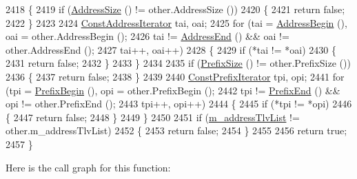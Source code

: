\begin{DoxyCode}
2418 \{
2419   \textcolor{keywordflow}{if} (\hyperlink{classns3_1_1PbbAddressBlock_a12f52e94b2f4197b1bc676b8d291a46e}{AddressSize} () != other.AddressSize ())
2420     \{
2421       \textcolor{keywordflow}{return} \textcolor{keyword}{false};
2422     \}
2423 
2424   \hyperlink{classns3_1_1PbbAddressBlock_ac1f10df8f85c0c8d4b729352bc32a7cf}{ConstAddressIterator} tai, oai;
2425   \textcolor{keywordflow}{for} (tai = \hyperlink{classns3_1_1PbbAddressBlock_a3eb4e97961cf32ffc66692ed2e9e8774}{AddressBegin} (), oai = other.AddressBegin ();
2426        tai != \hyperlink{classns3_1_1PbbAddressBlock_acf5ebced174e6605bff8cb3a439a81ae}{AddressEnd} () && oai != other.AddressEnd ();
2427        tai++, oai++)
2428     \{
2429       \textcolor{keywordflow}{if} (*tai != *oai)
2430         \{
2431           \textcolor{keywordflow}{return} \textcolor{keyword}{false};
2432         \}
2433     \}
2434 
2435   \textcolor{keywordflow}{if} (\hyperlink{classns3_1_1PbbAddressBlock_a5c19f01e9a4e7f3bf60a4241cbb89fe7}{PrefixSize} () != other.PrefixSize ())
2436     \{
2437       \textcolor{keywordflow}{return} \textcolor{keyword}{false};
2438     \}
2439 
2440   \hyperlink{classns3_1_1PbbAddressBlock_ac99d39169c106574b8c2aa51646bf404}{ConstPrefixIterator} tpi, opi;
2441   \textcolor{keywordflow}{for} (tpi = \hyperlink{classns3_1_1PbbAddressBlock_a25bc50d9f7ba1a17821a0907ac7ba352}{PrefixBegin} (), opi = other.PrefixBegin ();
2442        tpi != \hyperlink{classns3_1_1PbbAddressBlock_a10027797f34518ea3921a610011fc9d7}{PrefixEnd} () && opi != other.PrefixEnd ();
2443        tpi++, opi++)
2444     \{
2445       \textcolor{keywordflow}{if} (*tpi != *opi)
2446         \{
2447           \textcolor{keywordflow}{return} \textcolor{keyword}{false};
2448         \}
2449     \}
2450 
2451   \textcolor{keywordflow}{if} (\hyperlink{classns3_1_1PbbAddressBlock_aee976005ebb4d8ebeaec3e155d4800f1}{m\_addressTlvList} != other.m\_addressTlvList)
2452     \{
2453       \textcolor{keywordflow}{return} \textcolor{keyword}{false};
2454     \}
2455 
2456   \textcolor{keywordflow}{return} \textcolor{keyword}{true};
2457 \}
\end{DoxyCode}


Here is the call graph for this function\+:


